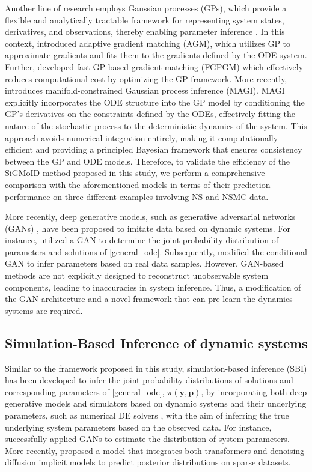 \documentclass[letterpaper]{article} %
\theoremstyle{thmstyleone}%
\theoremstyle{thmstyletwo}%
\theoremstyle{thmstylethree}%
\begin{document}
Another line of research employs Gaussian processes (GPs), which provide a flexible and analytically tractable framework for representing system states, derivatives, and observations, thereby enabling parameter inference \cite{calderhead2008accelerating, dondelinger2013ode, wenk2019fast, yang2021inference}. In this context, \cite{dondelinger2013ode} introduced adaptive gradient matching (AGM), which utilizes GP to approximate gradients and fits them to the gradients defined by the ODE system. Further, \cite{wenk2019fast} developed fast GP-based gradient matching (FGPGM) which effectively reduces computational cost by optimizing the GP framework. More recently, \cite{yang2021inference} introduces manifold-constrained Gaussian process inference (MAGI). MAGI explicitly incorporates the ODE structure into the GP model by conditioning the GP’s derivatives on the constraints defined by the ODEs, effectively fitting the nature of the stochastic process to the deterministic dynamics of the system. This approach avoids numerical integration entirely, making it computationally efficient and providing a principled Bayesian framework that ensures consistency between the GP and ODE models. Therefore, to validate the efficiency of the SiGMoID method proposed in this study, we perform a comprehensive comparison with the aforementioned models in terms of their prediction performance on three different examples involving NS and NSMC data.

More recently, deep generative models, such as generative adversarial networks (GANs) \cite{goodfellow2014generative}, have been proposed to imitate data based on dynamic systems. For instance, \cite{kadeethum2021framework, patel2022solution} utilized a GAN to determine the joint probability distribution of parameters and solutions of \cref{general_ode}. Subsequently, \cite{kadeethum2021framework} modified the conditional GAN \cite{mirza2014conditional} to infer parameters based on real data samples. However, GAN-based methods are not explicitly designed to reconstruct unobservable system components, leading to inaccuracies in system inference. Thus, a modification of the GAN architecture and a novel framework that can pre-learn the dynamics systems are required.

\subsection{Simulation-Based Inference of dynamic systems}
Similar to the framework proposed in this study, simulation-based inference (SBI) has been developed to infer the joint probability distributions of solutions and corresponding parameters of \cref{general_ode}, $\pi(\mathbf{y},\mathbf{p})$, by incorporating both deep generative models and simulators based on dynamic systems and their underlying parameters, such as numerical DE solvers  \cite{ramesh2022gatsbi,gloeckler2024all}, with the aim of inferring the true underlying system parameters based on the observed data. For instance, \cite{ramesh2022gatsbi} successfully applied GANs to estimate the distribution of system parameters. More recently, \cite{gloeckler2024all} proposed a model that integrates both transformers and denoising diffusion implicit models to predict posterior distributions on sparse datasets. 
\end{document}
